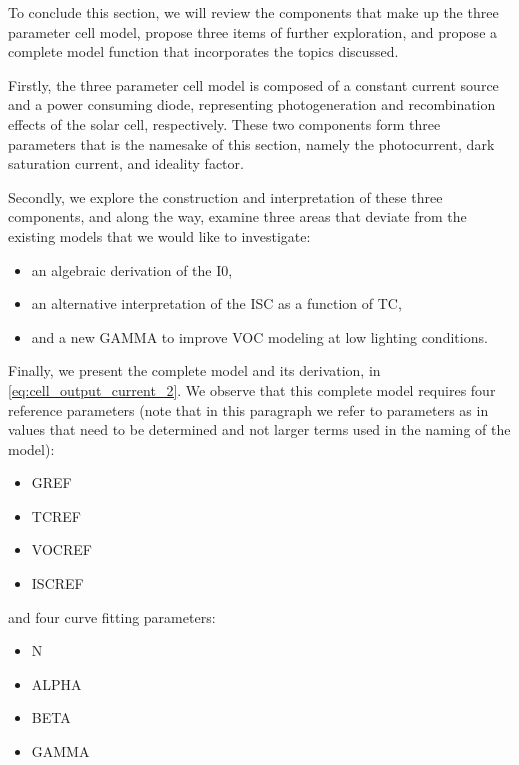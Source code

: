 To conclude this section, we will review the components that make up the three
parameter cell model, propose three items of further exploration, and propose a
complete model function that incorporates the topics discussed.

Firstly, the three parameter cell model is composed of a constant current source
and a power consuming diode, representing photogeneration and recombination
effects of the solar cell, respectively. These two components form three
parameters that is the namesake of this section, namely the photocurrent, dark
saturation current, and ideality factor.

Secondly, we explore the construction and interpretation of these three
components, and along the way, examine three areas that deviate from the
existing models that we would like to investigate:

\begin{itemize}
    \item an algebraic derivation of the \acf{I0},
    \item an alternative interpretation of the \acf{ISC} as
    a function of \acf{TC},
    \item and a new \acf{GAMMA} to improve \acf{VOC} modeling at low lighting
    conditions.
\end{itemize}

Finally, we present the complete model and its derivation, in
\autoref{eq:cell_output_current_2}. We observe that this complete model requires
four reference parameters (note that in this paragraph we refer to parameters as
in values that need to be determined and not larger terms used in the naming of
the model):

\begin{itemize}
    \item \acf{GREF}
    \item \acf{TCREF}
    \item \acf{VOCREF}
    \item \acf{ISCREF}
\end{itemize}

and four curve fitting parameters:

\begin{itemize}
    \item \acf{N}
    \item \acf{ALPHA}
    \item \acf{BETA}
    \item \acf{GAMMA}
\end{itemize}

